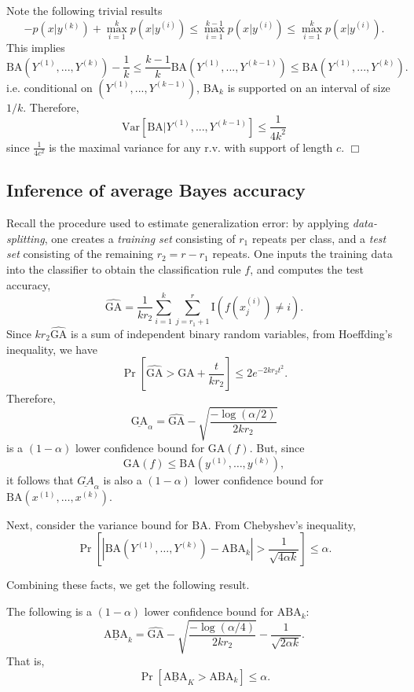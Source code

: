 Note the following trivial results
\[
-p(x|y^{(k)}) + \max_{i=1}^k p(x|y^{(i)})\leq \max_{i=1}^{k-1} p(x|y^{(i)}) \leq \max_{i=1}^k p(x|y^{(i)}).
\]
This implies
\[
\text{BA}(Y^{(1)},...,Y^{(k)}) - \frac{1}{k} \leq \frac{k-1}{k}\text{BA}(Y^{(1)},...,Y^{(k-1)}) \leq \text{BA}(Y^{(1)},...,Y^{(k)}).
\]
i.e. conditional on $(Y^{(1)},...,Y^{(k-1)})$, $\text{BA}_k$ is supported on an interval of size $1/k$.
Therefore,
\[
\text{Var}[\text{BA}|Y^{(1)},...,Y^{(k-1)}] \leq \frac{1}{4k^2}
\]
since $\frac{1}{4c^2}$ is the maximal variance for any r.v. with support of length $c$. $\Box$

\subsection{Inference of average Bayes accuracy}

Recall the procedure used to estimate generalization error: by
applying \emph{data-splitting}, one creates a \emph{training set}
consisting of $r_1$ repeats per class, and a \emph{test set}
consisting of the remaining $r_2 = r - r_1$ repeats.  One inputs the
training data into the classifier to obtain the classification rule
$f$, and computes the test accuracy,
\[
\widehat{\text{GA}} = \frac{1}{k r_2} \sum_{i=1}^k \sum_{j = r_1 + 1}^r \text{I}(f(x_j^{(i)}) \neq i).
\]
Since $kr_2 \widehat{\text{GA}}$ is a sum of independent binary random
variables, from Hoeffding's inequality, we have
\[
\Pr[\widehat{\text{GA}} > \text{GA} + \frac{t}{kr_2}] \leq 2e^{-2kr_2t^2}.
\]
Therefore,
\[
\underline{\text{GA}}_\alpha = \widehat{\text{GA}} - \sqrt{\frac{-\log(\alpha/2)}{2kr_2}}
\]
is a $(1-\alpha)$ lower confidence bound for $\text{GA}(f)$.
But, since
\[
\text{GA}(f) \leq \text{BA}(y^{(1)},\hdots, y^{(k)}),
\]
it follows that $\underline{GA}_\alpha$ is also a $(1-\alpha)$ lower confidence bound for $\text{BA}(x^{(1)},\hdots, x^{(k)})$.

Next, consider the variance bound for $\text{BA}$.  From Chebyshev's inequality,
\[
\Pr[|\text{BA}(Y^{(1)},\hdots, Y^{(k)}) - \text{ABA}_k| > \frac{1}{\sqrt{4\alpha k}}] \leq \alpha.
\]

Combining these facts, we get the following result.

\begin{theorem}
The following is a $(1-\alpha)$ lower confidence bound for $\text{ABA}_k$:
\[
\underline{\text{ABA}}_k = \widehat{\text{GA}} - \sqrt{\frac{-\log(\alpha/4)}{2kr_2}} - \frac{1}{\sqrt{2\alpha k}}.
\]
That is, 
\[
\Pr[\underline{\text{ABA}}_K > \text{ABA}_k] \leq \alpha.
\]
\end{theorem}

